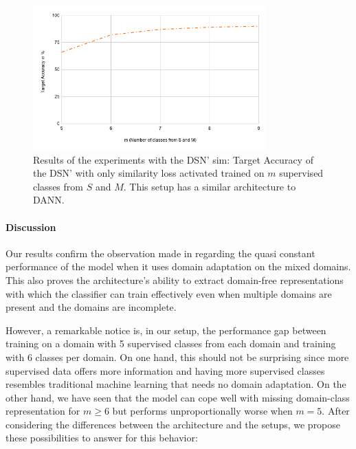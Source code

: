 \begin{figure}[tbh]
  \centering
    \includegraphics[width=0.8\textwidth]{abbildungen/mixeddaResults.png}
    \caption{Results of the experiments with the DSN' sim: Target Accuracy of the DSN' with only similarity loss activated trained on $m$ supervised classes from $S$ and $M$. This setup has a similar architecture to DANN.}
  \label{dia:mixedDA}
\end{figure}

\paragraph*{Discussion} Our results confirm the observation made in \cite{domainMixture} regarding the quasi constant performance of the model when it uses domain adaptation on the mixed domains. This also proves the architecture's ability to extract domain-free representations with which the classifier can train effectively even when multiple domains are present and the domains are incomplete.

However, a remarkable notice is, in our setup, the performance gap between training on a domain with 5 supervised classes from each domain and training with 6 classes per domain. On one hand, this should not be surprising since more supervised data offers more information and having more supervised classes resembles traditional machine learning that needs no domain adaptation. On the other hand, we have seen that the model can cope well with missing domain-class representation for $m \geqslant 6$ but performs unproportionally worse when $m=5$. After considering the differences between the architecture and the setups, we propose these possibilities to answer for this behavior:

